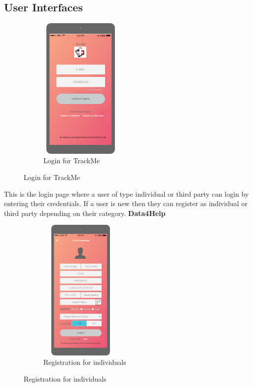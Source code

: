 \subsection{User Interfaces}
\begin{figure}[H]
	\centering
	\begin{subfigure}[b]{0.4\textwidth}	
		\includegraphics[width=4cm,height=7cm]		{./Mockups/1_Login.png}
      	\caption{Login for TrackMe}
        \label{TrackMe_login}
	 \end{subfigure}
\end{figure}
This is the login page where a user of type individual or third party can login by entering their credentials. If a user is new then they can register as individual or third party depending on their category.
\newline\newline\newline\newline
\textbf{Data4Help}
\newline{}

\begin{figure}[H]
	\centering
	\begin{subfigure}[b]{0.4\textwidth}	
		\includegraphics[width=4cm,height=7cm]		{./Mockups/2_I-Register.jpeg}
      	\caption{Registration for individuals}
        \label{TrackMe_register1}
	 \end{subfigure}
\end{figure}

